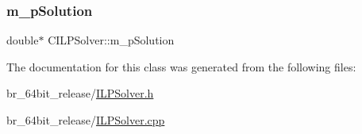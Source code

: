\subsubsection{\texorpdfstring{m\_pSolution}{m\_pSolution}}
{\footnotesize\ttfamily double$\ast$ C\+I\+L\+P\+Solver\+::m\+\_\+p\+Solution}



The documentation for this class was generated from the following files\+:\begin{DoxyCompactItemize}
\item 
br\+\_\+64bit\+\_\+release/\mbox{\hyperlink{ILPSolver_8h}{I\+L\+P\+Solver.\+h}}\item 
br\+\_\+64bit\+\_\+release/\mbox{\hyperlink{ILPSolver_8cpp}{I\+L\+P\+Solver.\+cpp}}\end{DoxyCompactItemize}
